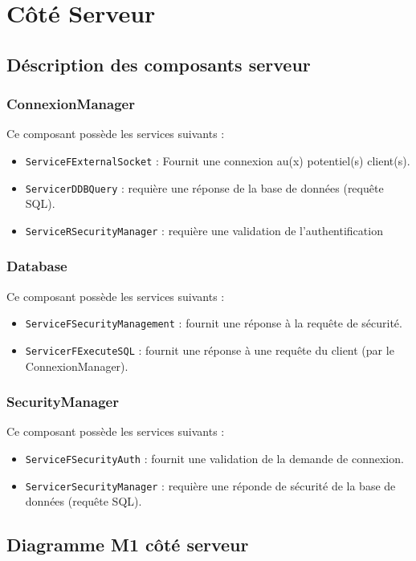 \section{Côté Serveur}
\subsection{Déscription des composants serveur}
\subsubsection{ConnexionManager}
Ce composant possède les services suivants : 
\begin{itemize}
\item 
  \verb+ServiceFExternalSocket+ : Fournit une connexion au(x) potentiel(s) client(s).
\item 
  \verb+ServicerDDBQuery+ :  requière une réponse de la base de données (requête SQL).
\item 
  \verb+ServiceRSecurityManager+ :  requière une validation de l'authentification
\end{itemize}

\subsubsection{Database}
Ce composant possède les services suivants : 
\begin{itemize}
\item 
  \verb+ServiceFSecurityManagement+ :  fournit une réponse à la requête de sécurité.
\item 
  \verb+ServicerFExecuteSQL+ :  fournit une réponse à une requête du client (par le ConnexionManager).
\end{itemize}

\subsubsection{SecurityManager}
Ce composant possède les services suivants : 
\begin{itemize}
\item 
  \verb+ServiceFSecurityAuth+ : fournit une validation de la demande de connexion.
\item 
  \verb+ServicerSecurityManager+ :  requière une réponde de sécurité de la base de données (requête SQL).
\end{itemize}


\subsection{Diagramme M1 côté serveur}

